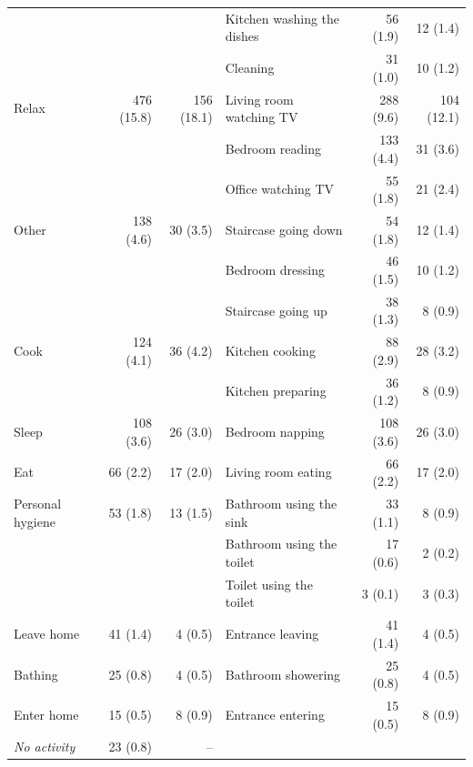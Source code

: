 \begin{tabular}{l rr l rr}
 &  &  & Kitchen washing the dishes & 56 (1.9) & 12 (1.4) \\
 &  &  & Cleaning & 31 (1.0) & 10 (1.2) \\
Relax & 476 (15.8) & 156 (18.1) & Living room watching TV & 288 (9.6) & 104 (12.1) \\
 &  &  & Bedroom reading & 133 (4.4) & 31 (3.6) \\
 &  &  & Office watching TV & 55 (1.8) & 21 (2.4) \\
Other & 138 (4.6) & 30 (3.5) & Staircase going down & 54 (1.8) & 12 (1.4) \\
 &  &  & Bedroom dressing & 46 (1.5) & 10 (1.2) \\
 &  &  & Staircase going up & 38 (1.3) & 8 (0.9) \\
Cook & 124 (4.1) & 36 (4.2) & Kitchen cooking & 88 (2.9) & 28 (3.2) \\
 &  &  & Kitchen preparing & 36 (1.2) & 8 (0.9) \\
Sleep & 108 (3.6) & 26 (3.0) & Bedroom napping & 108 (3.6) & 26 (3.0) \\
Eat & 66 (2.2) & 17 (2.0) & Living room eating & 66 (2.2) & 17 (2.0) \\
Personal hygiene & 53 (1.8) & 13 (1.5) & Bathroom using the sink & 33 (1.1) & 8 (0.9) \\
 &  &  & Bathroom using the toilet & 17 (0.6) & 2 (0.2) \\
 &  &  & Toilet using the toilet & 3 (0.1) & 3 (0.3) \\
Leave home & 41 (1.4) & 4 (0.5) & Entrance leaving & 41 (1.4) & 4 (0.5) \\
Bathing & 25 (0.8) & 4 (0.5) & Bathroom showering & 25 (0.8) & 4 (0.5) \\
Enter home & 15 (0.5) & 8 (0.9) & Entrance entering & 15 (0.5) & 8 (0.9) \\
\textit{No activity} & 23 (0.8) & -- &  &  &  \\
\bottomrule
\end{tabular}

